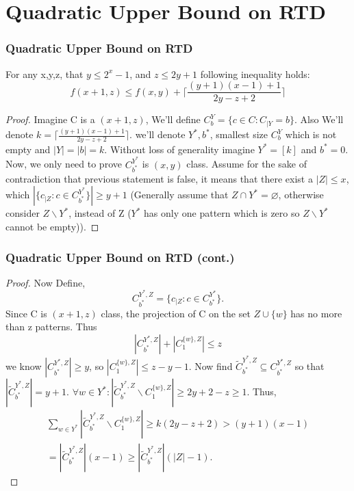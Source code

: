 \documentclass{beamer}
\begin{document}
\section{Quadratic Upper Bound on RTD}
\begin{frame}
\frametitle{Quadratic Upper Bound on RTD}

\begin{lemma}
For any x,y,z, that $y \leq 2^x - 1$, and $z \leq 2y + 1$ following inequality holds:
\begin{equation*}
f(x+1,z) \leq f(x,y) + \lceil \frac{(y+1)(x-1) + 1}{2y - z + 2} \rceil
\end{equation*}
\end{lemma}
\begin{proof}
Imagine C is a $(x+1,z)$, We'll define $C^Y_b = \{c \in C: C_{|Y} = b\}$. Also We'll denote $k = \lceil \frac{(y+1)(x-1) + 1}{2y - z + 2} \rceil$.
we'll denote $Y^*, b^*$, smallest size $C^Y_b$ which is not empty and $|Y| = |b| = k$. Without loss of generality imagine $Y^* = [k]$ and $b^* = 0$. Now, we only need to prove $C^{Y^*}_{b^*}$ is $(x,y)$ class. Assume for the sake of contradiction that previous statement is false, it means that  there exist a $|Z| \leq x$, which $|\{c_{|Z}:c\in C^{Y^*}_{b^*}\}| \geq y + 1$ (Generally assume that $Z \cap Y^* = \varnothing$, otherwise consider $Z\backslash Y^*$, instead of Z ($Y^*$ has only one pattern which is zero so $Z\backslash Y^*$ cannot be empty)).
\end{proof}
\end{frame}


\begin{frame}
\frametitle{Quadratic Upper Bound on RTD (cont.)}

\begin{proof}
Now Define,
\begin{equation*}
C^{Y^*, Z}_{b^*} = \{c_{|Z}: c \in C^{Y^*}_{b^*}\}.
\end{equation*}
Since C is $(x+1,z)$ class, the projection of C on the set $Z \cup \{w\}$ has no more than z patterns. Thus
\begin{equation*}
|C^{Y^*, Z}_{b^*}| + |C^{\{w\}, Z}_{1}| \leq z
\end{equation*}
we know $|C^{Y^*, Z}_{b^*}| \geq y$, so $|C^{\{w\}, Z}_{1}| \leq z- y -1$. Now find $\tilde{C}^{Y^*, Z}_{b^*} \subseteq C^{Y^*, Z}_{b^*}$ so that $|\tilde{C}^{Y^*, Z}_{b^*}| = y+1$. $\forall w \in Y^*: |\tilde{C}^{Y^*, Z}_{b^*} \backslash C^{\{w\}, Z}_{1}| \geq 2y + 2 -z \geq 1$. Thus,
\begin{align*}
\sum_{w \in Y^*} |\tilde{C}^{Y^*, Z}_{b^*} \backslash C^{\{w\}, Z}_{1}| \geq k(2y - z + 2) > (y + 1)(x - 1) \\= |\tilde{C}^{Y^*, Z}_{b^*}|(x - 1) \geq  |\tilde{C}^{Y^*, Z}_{b^*}|(|Z| - 1).    
\end{align*}
\end{proof}
\end{frame}
\end{document}
